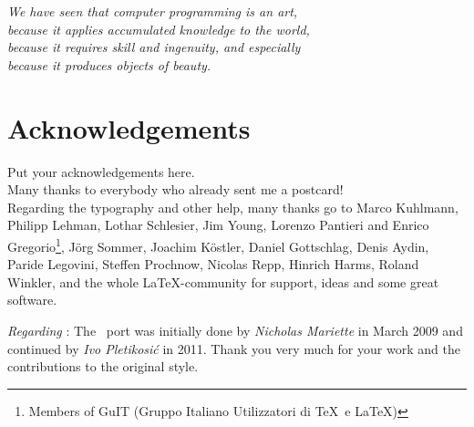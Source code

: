 

\begin{flushright}{\slshape
We have seen that computer programming is an art, \\
because it applies accumulated knowledge to the world, \\
because it requires skill and ingenuity, and especially \\
because it produces objects of beauty.} \\ \medskip
\end{flushright}

\bigskip


\begingroup

\let\clearpage\relax
\let\cleardoublepage\relax
\let\cleardoublepage\relax

\chapter*{Acknowledgements}

\noindent Put your acknowledgements here.\\

\noindent Many thanks to everybody who already sent me a postcard!\\

\noindent Regarding the typography and other help, many thanks go to Marco
Kuhlmann, Philipp Lehman, Lothar Schlesier, Jim Young, Lorenzo Pantieri and
Enrico Gregorio\footnote{Members of GuIT (Gruppo Italiano Utilizzatori di \TeX\
e \LaTeX )}, J\"org Sommer, Joachim K\"ostler, Daniel Gottschlag, Denis Aydin,
Paride Legovini, Steffen Prochnow, Nicolas Repp, Hinrich Harms, Roland Winkler,
and the whole \LaTeX-community for support, ideas and some great software.

\bigskip

\noindent\emph{Regarding \mLyX}: The \mLyX\ port was initially done by
\emph{Nicholas Mariette} in March 2009 and continued by
\emph{Ivo Pletikosi\'c} in 2011. Thank you very much for your work and the
contributions to the original style.

\endgroup
